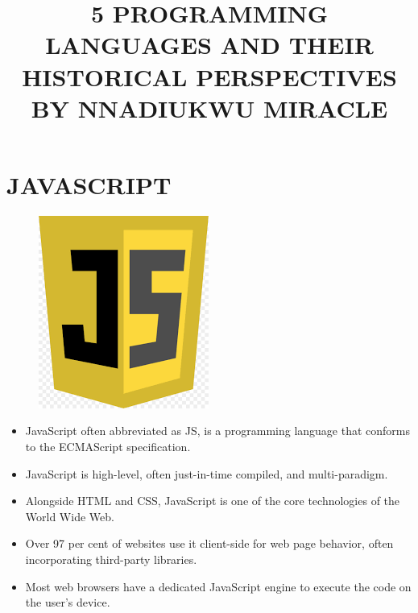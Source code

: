 \documentclass{article}
\title{5 PROGRAMMING LANGUAGES AND THEIR HISTORICAL PERSPECTIVES BY NNADIUKWU MIRACLE}
\begin{document}
	\maketitle
	\newpage
	\pagecolor{black}
		\color{white}
	\centering
	
	\section*{JAVASCRIPT}
	
	\begin{figure}
		\begin{center}
			\includegraphics[width=0.3\linewidth]{js.png}
			\end{center}
	\end{figure}
	\begin{itemize}
		\item JavaScript often abbreviated as JS, is a programming language that conforms to the ECMAScript specification.
		\item JavaScript is high-level, often just-in-time compiled, and multi-paradigm. 
		\item Alongside HTML and CSS, JavaScript is one of the core technologies of the World Wide Web. 
		\item Over 97 per cent of websites use it client-side for web page behavior, often incorporating third-party libraries. 
		\item Most web browsers have a dedicated JavaScript engine to execute the code on the user's device.
			\end{itemize}
			\newpage
\end{document}
